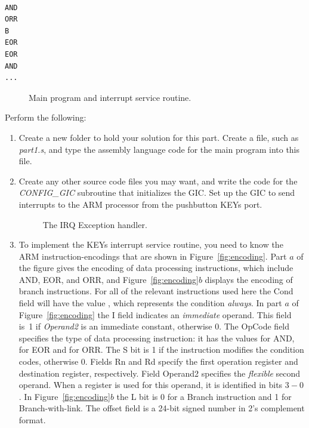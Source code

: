 \documentclass[epsfig,10pt,fullpage]{article}
\begin{document}
~\\
\begin{minipage}[t]{12.5 cm}
\begin{lstlisting}
AND
ORR
B
EOR
EOR
AND
...
\end{lstlisting}
\end{minipage}

\begin{figure}[H]
\begin{center}

\end{center}
\caption{Main program and interrupt service routine.}
\label{fig:code}
\end{figure}

\noindent
Perform the following:

\begin{enumerate}
\item Create a new folder to hold your solution for this part. Create a
file, such as {\it part1.s}, and type the assembly language code for the main program 
into this file. 

\item Create any other source code files you may want, and write the code for the
{\it CONFIG\_GIC} subroutine that initializes the GIC. Set up the GIC to send interrupts
to the ARM processor from the pushbutton KEYs port. 

\begin{figure}[t]
\begin{center}

\end{center}
\caption{The IRQ Exception handler.}
\label{fig:handler}
\end{figure}

\item 
To implement the KEYs interrupt service routine, you need to know the ARM
instruction-encodings that are shown in Figure~\ref{fig:encoding}.  Part $a$ of the figure 
gives the encoding of data processing instructions, which include AND, EOR, and 
ORR, and Figure~\ref{fig:encoding}$b$ displays the encoding of branch instructions. 
For all of the relevant instructions used here the {\sf Cond} 
field will have the value {}, which 
represents the condition {\it always}.  In part $a$ of Figure~\ref{fig:encoding}
the {\sf I} field indicates an {\it immediate} operand. This field is~1 if {\it Operand2}
is an immediate constant, otherwise 0. The {\sf OpCode} field specifies the type of data
processing instruction: it has the values {} for AND, {} for EOR and 
{} for ORR. The {\sf S} bit is 1 if the instruction modifies the condition codes, 
otherwise 0. Fields {\sf Rn} and {\sf Rd} specify the first operation register and destination 
register, respectively.  Field {\sf Operand2} specifies the {\it flexible} second operand. When 
a register is used for this operand, it is identified in bits $3-0$. In 
Figure~\ref{fig:encoding}$b$ the {\sf L} bit is 0 for a Branch instruction and 1 for 
Branch-with-link.  The {\sf offset} field is a 24-bit signed number in 2's complement format.


\end{enumerate}
\end{document}
